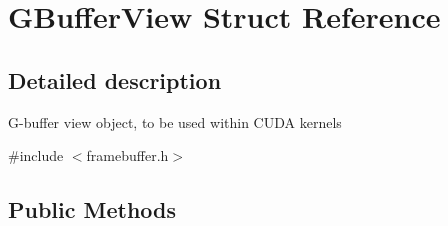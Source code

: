 \hypertarget{struct_g_buffer_view}{}\section{G\+Buffer\+View Struct Reference}
\label{struct_g_buffer_view}


\subsection{Detailed description}
G-\/buffer view object, to be used within C\+U\+DA kernels 

{\ttfamily \#include $<$framebuffer.\+h$>$}

\subsection*{Public Methods}
